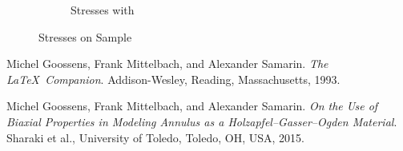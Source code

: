 \documentclass[12pt]{article}
\begin{document}
\begin{figure}[!htb]
\begin{subfigure}{.5\textwidth}
    \caption{Stresses with }
   \end{subfigure}
  \caption{Stresses on Sample}
  \label{fig:4}
\end{figure}


\pagebreak
\begin{thebibliography}{9}
Michel Goossens, Frank Mittelbach, and Alexander Samarin. 
\textit{The \LaTeX\ Companion}. 
Addison-Wesley, Reading, Massachusetts, 1993.

 Michel Goossens, Frank Mittelbach, and Alexander Samarin. 
\textit{On the Use of Biaxial Properties in Modeling Annulus as a Holzapfel–Gasser–Ogden Material}. 
Sharaki et al., University of Toledo, Toledo, OH, USA, 2015.

\end{thebibliography}
\end{document}
